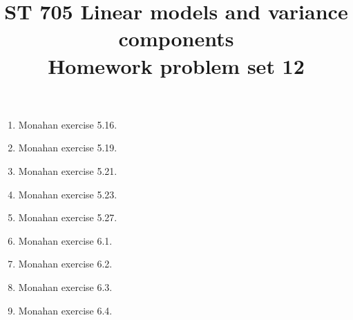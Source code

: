 \documentclass[11pt]{article}
\title{ST 705 Linear models and variance components \\ 
        Homework problem set 12}
\begin{document}
\maketitle

\begin{enumerate}

\item Monahan exercise 5.16.

\item Monahan exercise 5.19.

\item Monahan exercise 5.21.

\item Monahan exercise 5.23.

\item Monahan exercise 5.27.

\item Monahan exercise 6.1.

\item Monahan exercise 6.2.

\item Monahan exercise 6.3.

\item Monahan exercise 6.4.

\end{enumerate}
\end{document}

